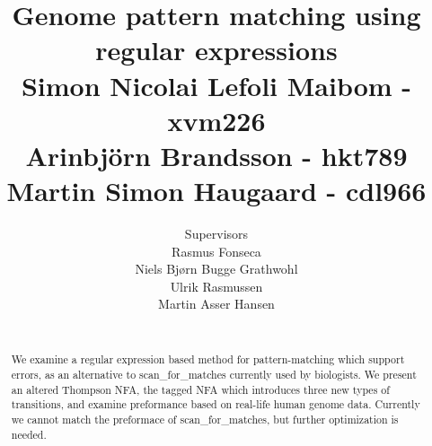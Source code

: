 \documentclass{article}
\author{
\huge{Supervisors}\\
\Large{Rasmus Fonseca}\\
\Large{Niels Bjørn Bugge Grathwohl}\\
\Large{Ulrik Rasmussen}\\
\Large{Martin Asser Hansen}\\
    \\ \texttt{}
}
\title{
  \vspace{3cm}
  \Huge{Genome pattern matching using regular expressions} \\
  \Large{Simon Nicolai Lefoli Maibom - xvm226} \\
  \Large{Arinbjörn Brandsson - hkt789}\\
  \Large{Martin Simon Haugaard - cdl966}
}
\begin{document}


\clearpage\maketitle
\thispagestyle{empty}

\newpage
\begin{abstract}
We examine a regular expression based method for pattern-matching which support errors, as an alternative to scan\_for\_matches currently used by biologists. We present an altered Thompson NFA, the tagged NFA which introduces three new types of transitions, and examine preformance based on real-life human genome data. Currently we cannot match the preformace of scan\_for\_matches, but further optimization is needed.
\end{abstract}
\newpage
\tableofcontents
 
\newpage


















\end{document}
